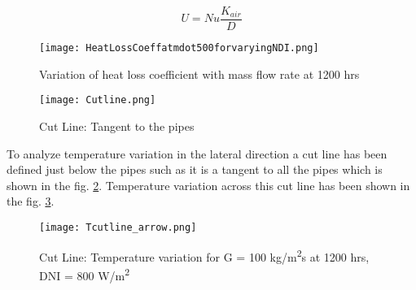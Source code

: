 \begin{equation}\label{eq:U}
U = Nu\frac{K_{air}}{D}
\end{equation}



\begin{figure}[H]
\begin{center}
\texttt{[image: HeatLossCoeffatmdot500forvaryingNDI.png]}
\caption{Variation of heat loss coefficient with mass flow rate at 1200 hrs}
\label{fig:UvariationwithG}
\end{center}
\end{figure}

\begin{figure}[H]
\begin{center}
\texttt{[image: Cutline.png]}
\caption{Cut Line: Tangent to the pipes}
\label{fig:cutline}
\end{center}
\end{figure}
To analyze temperature variation in the lateral direction a cut line has been defined just below the pipes such as it is a tangent to all the pipes which is shown in the fig. \ref{fig:cutline}. Temperature variation across this cut line has been shown in the fig. \ref{fig:Tcutline}.

\begin{figure}[H]
\begin{center}
\texttt{[image: Tcutline\_arrow.png]}
\caption{Cut Line: Temperature variation for G = 100 kg/m\textsuperscript{2}s at 1200 hrs, DNI = 800 W/m\textsuperscript{2}}
\label{fig:Tcutline}
\end{center}
\end{figure}

